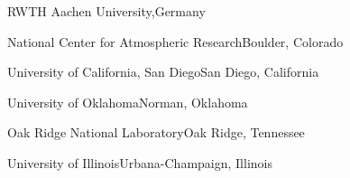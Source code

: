 \begin{multicols}{2}
{RWTH Aachen University,}{Germany}

 {National Center for Atmospheric
Research}{Boulder, Colorado}

 {University of California, San Diego}{San
Diego, California}

 {University of Oklahoma}{Norman, Oklahoma}

 {Oak Ridge National Laboratory}{Oak
Ridge, Tennessee}

 {University of Illinois}{Urbana-Champaign,
Illinois}

\end{multicols}
